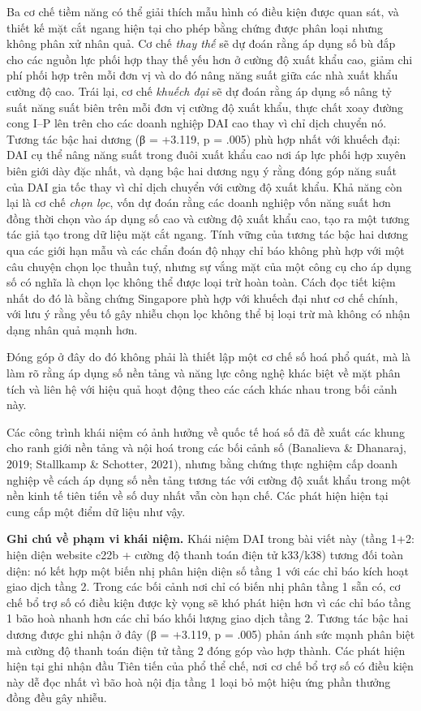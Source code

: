 \documentclass[12pt,a4paper]{article}
\begin{document}
Ba cơ chế tiềm năng có thể giải thích mẫu hình có điều kiện được quan
sát, và thiết kế mặt cắt ngang hiện tại cho phép bằng chứng được phân
loại nhưng không phân xử nhân quả. Cơ chế \emph{thay thế} sẽ dự đoán
rằng áp dụng số bù đắp cho các nguồn lực phối hợp thay thế yếu hơn ở
cường độ xuất khẩu cao, giảm chi phí phối hợp trên mỗi đơn vị và do đó
nâng năng suất giữa các nhà xuất khẩu cường độ cao. Trái lại, cơ chế
\emph{khuếch đại} sẽ dự đoán rằng áp dụng số nâng tỷ suất năng suất biên
trên mỗi đơn vị cường độ xuất khẩu, thực chất xoay đường cong I--P lên
trên cho các doanh nghiệp DAI cao thay vì chỉ dịch chuyển nó. Tương tác
bậc hai dương (β = +3.119, p = .005) phù hợp nhất với khuếch đại: DAI cụ
thể nâng năng suất trong đuôi xuất khẩu cao nơi áp lực phối hợp xuyên
biên giới dày đặc nhất, và dạng bậc hai dương ngụ ý rằng đóng góp năng
suất của DAI gia tốc thay vì chỉ dịch chuyển với cường độ xuất khẩu. Khả
năng còn lại là cơ chế \emph{chọn lọc}, vốn dự đoán rằng các doanh
nghiệp vốn năng suất hơn đồng thời chọn vào áp dụng số cao và cường độ
xuất khẩu cao, tạo ra một tương tác giả tạo trong dữ liệu mặt cắt ngang.
Tính vững của tương tác bậc hai dương qua các giới hạn mẫu và các chẩn
đoán độ nhạy chỉ báo không phù hợp với một câu chuyện chọn lọc thuần
tuý, nhưng sự vắng mặt của một công cụ cho áp dụng số có nghĩa là chọn
lọc không thể được loại trừ hoàn toàn. Cách đọc tiết kiệm nhất do đó là
bằng chứng Singapore phù hợp với khuếch đại như cơ chế chính, với lưu ý
rằng yếu tố gây nhiễu chọn lọc không thể bị loại trừ mà không có nhận
dạng nhân quả mạnh hơn.

Đóng góp ở đây do đó không phải là thiết lập một cơ chế số hoá phổ quát,
mà là làm rõ rằng áp dụng số nền tảng và năng lực công nghệ khác biệt về
mặt phân tích và liên hệ với hiệu quả hoạt động theo các cách khác nhau
trong bối cảnh này.

Các công trình khái niệm có ảnh hưởng về quốc tế hoá số đã đề xuất các
khung cho ranh giới nền tảng và nội hoá trong các bối cảnh số (Banalieva
\& Dhanaraj, 2019; Stallkamp \& Schotter, 2021), nhưng bằng chứng thực
nghiệm cấp doanh nghiệp về cách áp dụng số nền tảng tương tác với cường
độ xuất khẩu trong một nền kinh tế tiên tiến về số duy nhất vẫn còn hạn
chế. Các phát hiện hiện tại cung cấp một điểm dữ liệu như vậy.

\textbf{Ghi chú về phạm vi khái niệm.} Khái niệm DAI trong bài viết này
(tầng 1+2: hiện diện website c22b + cường độ thanh toán điện tử k33/k38)
tương đối toàn diện: nó kết hợp một biến nhị phân hiện diện số tầng 1
với các chỉ báo kích hoạt giao dịch tầng 2. Trong các bối cảnh nơi chỉ
có biến nhị phân tầng 1 sẵn có, cơ chế bổ trợ số có điều kiện được kỳ
vọng sẽ khó phát hiện hơn vì các chỉ báo tầng 1 bão hoà nhanh hơn các
chỉ báo khối lượng giao dịch tầng 2. Tương tác bậc hai dương được ghi
nhận ở đây (β = +3.119, p = .005) phản ánh sức mạnh phân biệt mà cường
độ thanh toán điện tử tầng 2 đóng góp vào hợp thành. Các phát hiện hiện
tại ghi nhận đầu Tiên tiến của phổ thể chế, nơi cơ chế bổ trợ số có điều
kiện này dễ đọc nhất vì bão hoà nội địa tầng 1 loại bỏ một hiệu ứng phần
thưởng đồng đều gây nhiễu.
\end{document}
